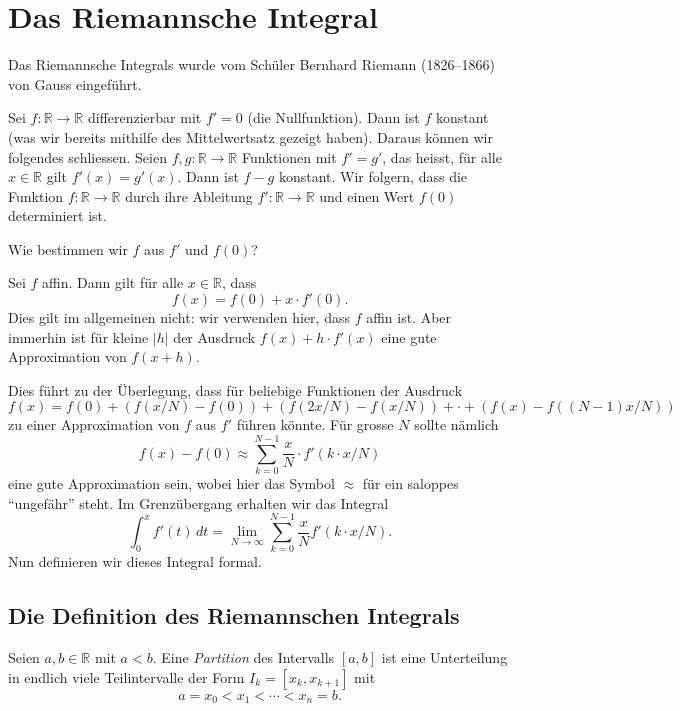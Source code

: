 \documentclass[../main.tex]{subfiles}
\begin{document}
\chapter{Das Riemannsche Integral}
Das Riemannsche Integrals wurde
vom Schüler Bernhard Riemann (1826--1866)
von Gauss eingeführt.

Sei $f \colon \mathbb{R} \to \mathbb{R}$ differenzierbar
mit $f' = 0$ (die Nullfunktion).
Dann ist $f$ konstant (was wir bereits mithilfe des
Mittelwertsatz gezeigt haben). Daraus können wir
folgendes schliessen.
Seien $f, g \colon \mathbb{R} \to \mathbb{R}$ 
Funktionen mit
$f' = g'$, das heisst, für alle $x \in \mathbb{R}$
gilt $f'(x) = g'(x)$.
Dann ist $f - g$ konstant.
Wir folgern, dass die Funktion $f \colon \mathbb{R} \to \mathbb{R}$ 
durch ihre Ableitung $f' \colon \mathbb{R} \to \mathbb{R}$ 
und einen Wert $f(0)$ determiniert ist.

\begin{question}
  Wie bestimmen wir $f$ aus $f'$ 
  und $f(0)$?
\end{question}

\begin{specialcase}
  Sei $f$ affin. Dann gilt für alle
  $x \in \mathbb{R}$, dass
  \[
    f(x) = f(0) + x \cdot f'(0).
  \]
  Dies gilt im allgemeinen nicht: wir verwenden
  hier, dass $f$ affin ist.
  Aber immerhin ist für kleine $|h|$
  der Ausdruck $f(x) + h \cdot f'(x)$ eine
  gute Approximation von $f(x + h)$.
\end{specialcase}

Dies führt zu der Überlegung, dass für beliebige
Funktionen der Ausdruck
\[
  f(x) = f(0) + (f(x/N) - f(0))
  + (f(2x/N) - f(x/N)) + \cdot
  + (f(x) - f((N-1)x/N))
\]
zu einer Approximation von $f$ aus
$f'$ führen könnte. Für grosse $N$ 
sollte nämlich
\[
  f(x) - f(0) \approx \sum_{k = 0}^{N - 1} 
  \frac{x}{N} \cdot f'(k \cdot x / N)
\]
eine gute Approximation sein, wobei
hier das Symbol $\approx$ für ein
saloppes ``ungefähr'' steht.
Im Grenzübergang erhalten wir das
Integral
\[
  \int_{0}^{x} f'(t) \, dt =
  \lim_{N \to \infty} \sum_{k = 0}^{N - 1} \frac{x}{N}
  f'(k \cdot x/N).
\]
Nun definieren wir dieses Integral formal.

\section{Die Definition des Riemannschen Integrals}
\begin{definition}
  Seien $a,b \in \mathbb{R}$
  mit $a < b$. Eine \emph{Partition} des Intervalls
  $[a, b]$ ist eine Unterteilung in
  endlich viele Teilintervalle der
  Form
  $I_k = [x_k, x_{k  + 1}]$ mit
  \[
    a = x_0 < x_1 < \cdots < x_n = b.
  \]
\end{definition}
\end{document}
